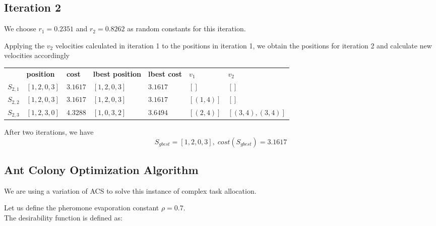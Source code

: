 \documentclass[a4paper]{article}
\begin{document}
\subsection{Iteration 2}

We choose $r_1 = 0.2351$ and $r_2 = 0.8262$ as random constants for this
iteration.

Applying the $v_2$ velocities calculated in iteration 1 to the positions in
iteration 1, we obtain the positions for iteration 2 and calculate new
velocities accordingly
\begin{center}
\begin{tabular}{lllllll}
          & \textbf{position} & \textbf{cost} & \textbf{lbest position} & \textbf{lbest cost} & $v_1$      & $v_2$            \\
$S_{2,1}$ & $[1, 2, 0, 3]$    & $3.1617$      & $[1, 2, 0, 3]$          & $3.1617$            & $[]      $ & $[]$             \\
$S_{2,2}$ & $[1, 2, 0, 3]$    & $3.1617$      & $[1, 2, 0, 3]$          & $3.1617$            & $[(1, 4)]$ & $[]$             \\
$S_{2,3}$ & $[1, 2, 3, 0]$    & $4.3288$      & $[1, 0, 3, 2]$          & $3.6494$            & $[(2, 4)]$ & $[(3,4), (3,4)]$ \\
\end{tabular}
\end{center}
\vspace{1.5em}

After two iterations, we have
$$S_\mathit{gbest} = [1, 2, 0, 3], \; cost(S_\mathit{gbest}) = 3.1617$$

\subsection{Ant Colony Optimization Algorithm} %

We are using a variation of ACS to solve this instance of complex task allocation.

Let us define the pheromone evaporation constant $\rho=0.7$.\\
The desirability function is defined as:
\end{document}
